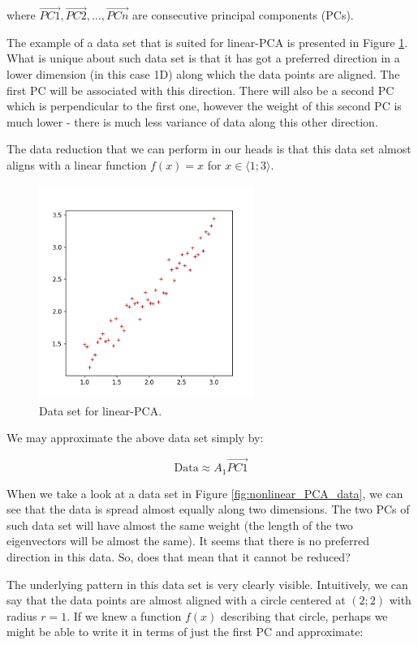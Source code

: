 \documentclass[10pt,twocolumn]{article}
\begin{document}
where $\vec{PC1}, \vec{PC2}, \dots, \vec{PCn}$ are consecutive principal components (PCs).

The example of a data set that is suited for linear-PCA is presented in Figure \ref{fig:linear_PCA_data}. What is unique about such data set is that it has got a preferred direction in a lower dimension (in this case 1D) along which the data points are aligned. The first PC will be associated with this direction. There will also be a second PC which is perpendicular to the first one, however the weight of this second PC is much lower - there is much less variance of data along this other direction.

The data reduction that we can perform in our heads is that this data set almost aligns with a linear function $f(x) = x$ for $x \in \langle 1; 3 \rangle$.

\begin{figure}[H]
\centering\includegraphics[width=7cm]{../python/PCA-fake-datasets/PCA_linear_scatter_1.png}
\caption{Data set for linear-PCA.}			
\label{fig:linear_PCA_data}
\end{figure}

We may approximate the above data set simply by:

\begin{equation}
\text{Data} \approx A_1 \vec{PC1}
\end{equation}

When we take a look at a data set in Figure \ref{fig:nonlinear_PCA_data}, we can see that the data is spread almost equally along two dimensions. The two PCs of such data set will have almost the same weight (the length of the two eigenvectors will be almost the same). It seems that there is no preferred direction in this data. So, does that mean that it cannot be reduced?

The underlying pattern in this data set is very clearly visible. Intuitively, we can say that the data points are almost aligned with a circle centered at $(2;2)$ with radius $r=1$. If we knew a function $f(x)$ describing that circle, perhaps we might be able to write it in terms of just the first PC and approximate:
\end{document}
